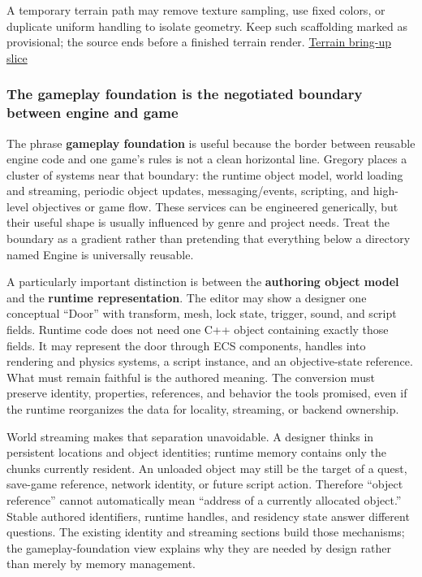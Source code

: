 A temporary terrain path may remove texture sampling, use fixed colors, or duplicate uniform handling to isolate geometry. Keep such scaffolding marked as provisional; the source ends before a finished terrain render. \href{https://www.youtube.com/watch?v=X9EYh-EfOz4}{Terrain bring-up slice}

\subsubsection{The gameplay foundation is the negotiated boundary between engine and game}\label{the-gameplay-foundation-is-the-negotiated-boundary-between-engine-and-game}

The phrase \textbf{gameplay foundation} is useful because the border between reusable engine code and one game's rules is not a clean horizontal line. Gregory places a cluster of systems near that boundary: the runtime object model, world loading and streaming, periodic object updates, messaging/events, scripting, and high-level objectives or game flow. These services can be engineered generically, but their useful shape is usually influenced by genre and project needs. Treat the boundary as a gradient rather than pretending that everything below a directory named Engine is universally reusable.

A particularly important distinction is between the \textbf{authoring object model} and the \textbf{runtime representation}. The editor may show a designer one conceptual ``Door'' with transform, mesh, lock state, trigger, sound, and script fields. Runtime code does not need one C++ object containing exactly those fields. It may represent the door through ECS components, handles into rendering and physics systems, a script instance, and an objective-state reference. What must remain faithful is the authored meaning. The conversion must preserve identity, properties, references, and behavior the tools promised, even if the runtime reorganizes the data for locality, streaming, or backend ownership.

World streaming makes that separation unavoidable. A designer thinks in persistent locations and object identities; runtime memory contains only the chunks currently resident. An unloaded object may still be the target of a quest, save-game reference, network identity, or future script action. Therefore ``object reference'' cannot automatically mean ``address of a currently allocated object.'' Stable authored identifiers, runtime handles, and residency state answer different questions. The existing identity and streaming sections build those mechanisms; the gameplay-foundation view explains why they are needed by design rather than merely by memory management.

